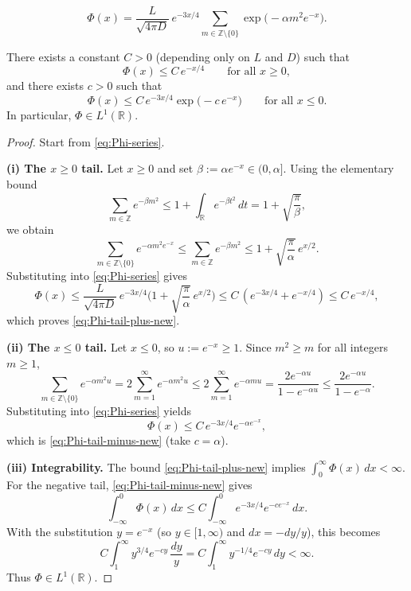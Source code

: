 \documentclass[10pt,a4paper]{amsart}
\begin{document}
\begin{equation}
\label{eq:Phi-series}
\Phi(x)
=
\frac{L}{\sqrt{4\pi D}}\,
e^{-3x/4}
\sum_{m\in\mathbb Z\setminus\{0\}}
\exp\!\big(-\alpha m^2 e^{-x}\big).
\end{equation}

\begin{lemma}
\label{lem:Phi-L1-new}
There exists a constant $C>0$ (depending only on $L$ and $D$) such that
\begin{equation}
\label{eq:Phi-tail-plus-new}
\Phi(x)\le C\,e^{-x/4}\qquad\text{for all }x\ge 0,
\end{equation}
and there exists $c>0$ such that
\begin{equation}
\label{eq:Phi-tail-minus-new}
\Phi(x)\le C\,e^{-3x/4}\exp\!\big(-c\,e^{-x}\big)\qquad\text{for all }x\le 0.
\end{equation}
In particular, $\Phi\in L^1(\mathbb R)$.
\end{lemma}

\begin{proof}
Start from \eqref{eq:Phi-series}.

\smallskip
\noindent\textbf{(i) The $x\ge0$ tail.}
Let $x\ge 0$ and set $\beta:=\alpha e^{-x}\in(0,\alpha]$. Using the elementary bound
\[
\sum_{m\in\mathbb Z} e^{-\beta m^2}
\le
1+\int_{\mathbb R} e^{-\beta t^2}\,dt
=
1+\sqrt{\frac{\pi}{\beta}},
\]
we obtain
\[
\sum_{m\in\mathbb Z\setminus\{0\}} e^{-\alpha m^2 e^{-x}}
\le
\sum_{m\in\mathbb Z} e^{-\beta m^2}
\le
1+\sqrt{\frac{\pi}{\alpha}}\,e^{x/2}.
\]
Substituting into \eqref{eq:Phi-series} gives
\[
\Phi(x)
\le
\frac{L}{\sqrt{4\pi D}}\,e^{-3x/4}\Big(1+\sqrt{\frac{\pi}{\alpha}}\,e^{x/2}\Big)
\le
C\,(e^{-3x/4}+e^{-x/4})
\le
C\,e^{-x/4},
\]
which proves \eqref{eq:Phi-tail-plus-new}.

\smallskip
\noindent\textbf{(ii) The $x\le0$ tail.}
Let $x\le 0$, so $u:=e^{-x}\ge 1$. Since $m^2\ge m$ for all integers $m\ge1$,
\[
\sum_{m\in\mathbb Z\setminus\{0\}} e^{-\alpha m^2 u}
=
2\sum_{m=1}^\infty e^{-\alpha m^2 u}
\le
2\sum_{m=1}^\infty e^{-\alpha m u}
=
\frac{2e^{-\alpha u}}{1-e^{-\alpha u}}
\le
\frac{2e^{-\alpha u}}{1-e^{-\alpha}}.
\]
Substituting into \eqref{eq:Phi-series} yields
\[
\Phi(x)\le C\,e^{-3x/4}e^{-\alpha e^{-x}},
\]
which is \eqref{eq:Phi-tail-minus-new} (take $c=\alpha$).

\smallskip
\noindent\textbf{(iii) Integrability.}
The bound \eqref{eq:Phi-tail-plus-new} implies $\int_0^\infty \Phi(x)\,dx<\infty$.
For the negative tail, \eqref{eq:Phi-tail-minus-new} gives
\[
\int_{-\infty}^0 \Phi(x)\,dx
\le
C\int_{-\infty}^0 e^{-3x/4}e^{-c e^{-x}}\,dx.
\]
With the substitution $y=e^{-x}$ (so $y\in[1,\infty)$ and $dx=-dy/y$), this becomes
\[
C\int_1^\infty y^{3/4}e^{-cy}\,\frac{dy}{y}
=
C\int_1^\infty y^{-1/4}e^{-cy}\,dy
<
\infty.
\]
Thus $\Phi\in L^1(\mathbb R)$.
\end{proof}
\end{document}
